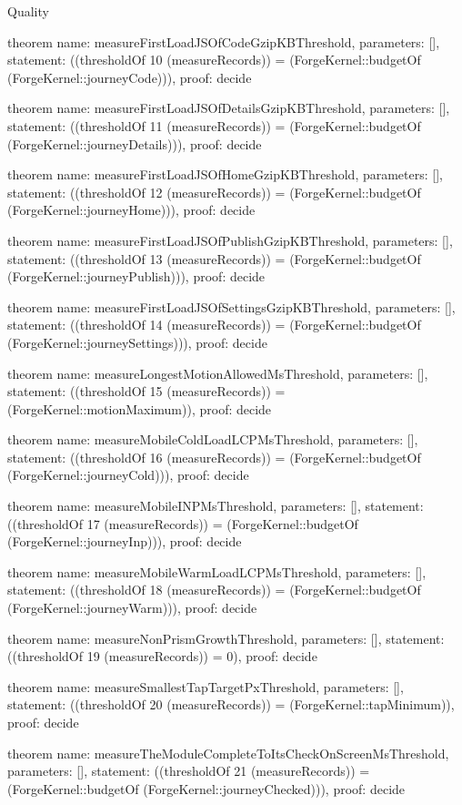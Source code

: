 \begin{lexlean}{Quality}
\begin{semanticmodule}
theorem{
  name: measureFirstLoadJSOfCodeGzipKBThreshold,
  parameters: [],
  statement: ((thresholdOf 10 (measureRecords)) = (ForgeKernel::budgetOf (ForgeKernel::journeyCode))),
  proof: decide{}
}

theorem{
  name: measureFirstLoadJSOfDetailsGzipKBThreshold,
  parameters: [],
  statement: ((thresholdOf 11 (measureRecords)) = (ForgeKernel::budgetOf (ForgeKernel::journeyDetails))),
  proof: decide{}
}

theorem{
  name: measureFirstLoadJSOfHomeGzipKBThreshold,
  parameters: [],
  statement: ((thresholdOf 12 (measureRecords)) = (ForgeKernel::budgetOf (ForgeKernel::journeyHome))),
  proof: decide{}
}

theorem{
  name: measureFirstLoadJSOfPublishGzipKBThreshold,
  parameters: [],
  statement: ((thresholdOf 13 (measureRecords)) = (ForgeKernel::budgetOf (ForgeKernel::journeyPublish))),
  proof: decide{}
}

theorem{
  name: measureFirstLoadJSOfSettingsGzipKBThreshold,
  parameters: [],
  statement: ((thresholdOf 14 (measureRecords)) = (ForgeKernel::budgetOf (ForgeKernel::journeySettings))),
  proof: decide{}
}

theorem{
  name: measureLongestMotionAllowedMsThreshold,
  parameters: [],
  statement: ((thresholdOf 15 (measureRecords)) = (ForgeKernel::motionMaximum)),
  proof: decide{}
}

theorem{
  name: measureMobileColdLoadLCPMsThreshold,
  parameters: [],
  statement: ((thresholdOf 16 (measureRecords)) = (ForgeKernel::budgetOf (ForgeKernel::journeyCold))),
  proof: decide{}
}

theorem{
  name: measureMobileINPMsThreshold,
  parameters: [],
  statement: ((thresholdOf 17 (measureRecords)) = (ForgeKernel::budgetOf (ForgeKernel::journeyInp))),
  proof: decide{}
}

theorem{
  name: measureMobileWarmLoadLCPMsThreshold,
  parameters: [],
  statement: ((thresholdOf 18 (measureRecords)) = (ForgeKernel::budgetOf (ForgeKernel::journeyWarm))),
  proof: decide{}
}

theorem{
  name: measureNonPrismGrowthThreshold,
  parameters: [],
  statement: ((thresholdOf 19 (measureRecords)) = 0),
  proof: decide{}
}

theorem{
  name: measureSmallestTapTargetPxThreshold,
  parameters: [],
  statement: ((thresholdOf 20 (measureRecords)) = (ForgeKernel::tapMinimum)),
  proof: decide{}
}

theorem{
  name: measureTheModuleCompleteToItsCheckOnScreenMsThreshold,
  parameters: [],
  statement: ((thresholdOf 21 (measureRecords)) = (ForgeKernel::budgetOf (ForgeKernel::journeyChecked))),
  proof: decide{}
}


\end{semanticmodule}
\end{lexlean}
